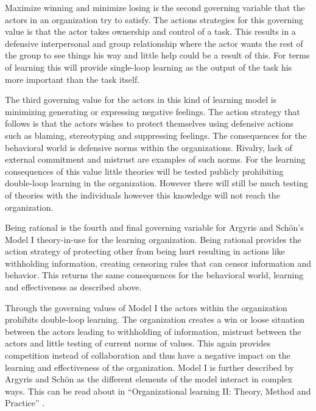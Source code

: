 Maximize winning and minimize losing is the second governing variable that the actors in an organization try to satisfy. The actions strategies for this governing value is that the actor takes ownership and control of a task. This results in a defensive interpersonal and group relationship where the actor wants the rest of the group to see things his way and little help could be a result of this. For terms of learning this will provide single-loop learning as the output of the task his more important than the task itself. 

The third governing value for the actors in this kind of learning model is minimizing generating or expressing negative feelings. The action strategy that follows is that the actors wishes to protect themselves using defensive actions such as blaming, stereotyping and suppressing feelings. The consequences for the behavioral world is defensive norms within the organizations. Rivalry, lack of external commitment and mistrust are examples of such norms. For the learning consequences of this value little theories will be tested publicly prohibiting double-loop learning in the organization. However there will still be much testing of theories with the individuals however this knowledge will not reach the organization. 

Being rational is the fourth and final governing variable for Argyris and Schön's Model I theory-in-use for the learning organization. Being rational provides the action strategy of protecting other from being hurt resulting in actions like withholding information, creating censoring rules that can censor information and behavior. This returns the same consequences for the behavioral world, learning and effectiveness as described above. 

Through the governing values of Model I the actors within the organization prohibits double-loop learning. The organization creates a win or loose situation between the actors leading to withholding of information, mistrust between the actors and little testing of current norms of values. This again provides competition instead of collaboration and thus have a negative impact on the learning and effectiveness of the organization. Model I is further described by Argyris and Schön as the different elements of the model interact in complex ways. This can be read about in ``Organizational learning II: Theory, Method and Practice'' \cite{Argyris1996}.


